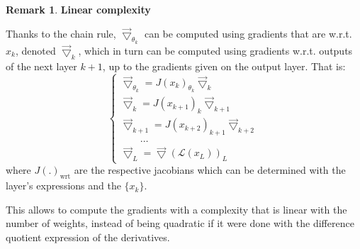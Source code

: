 \documentclass{article}
\theoremstyle{definition}
\newtheorem{remark}{Remark}
\newcommand{\ovec}{}
\begin{document}
\begin{remark}\textbf{Linear complexity}\\
{Thanks to the chain rule, $\vec{\bigtriangledown}_{\theta_k}$ can be computed using gradients that are w.r.t. $\ovec{x_k}$, denoted $\vec{\bigtriangledown}_k$, which in turn can be computed using gradients w.r.t. outputs of the next layer $k+1$, up to the gradients given on the output layer. That is:
$$
\left\{
\begin{array}{l}
  \vec{\bigtriangledown}_{\theta_k} = J(\ovec{x_k})_{\theta_k} \vec{\bigtriangledown}_{k}\\
  \vec{\bigtriangledown}_{k} = J(\ovec{x_{k+1}})_{k} \vec{\bigtriangledown}_{k+1} \label{eq:bph} \\
  \vec{\bigtriangledown}_{k+1} = J(\ovec{x_{k+2}})_{k+1} \vec{\bigtriangledown}_{k+2} \label{eq:bph} \\
  \quad \quad \ldots\\
  \vec{\bigtriangledown}_{L} = \vec{\bigtriangledown}(\mathcal{L}(\ovec{x_L}))_L
\end{array}
\right.
$$
where $J(.)_{\text{wrt}}$ are the respective jacobians which can be determined with the layer's expressions and the $\{x_k\}$.

This allows to compute the gradients with a complexity that is linear with the number of weights, instead of being quadratic if it were done with the difference quotient expression of the derivatives.}
\end{remark}
\end{document}

